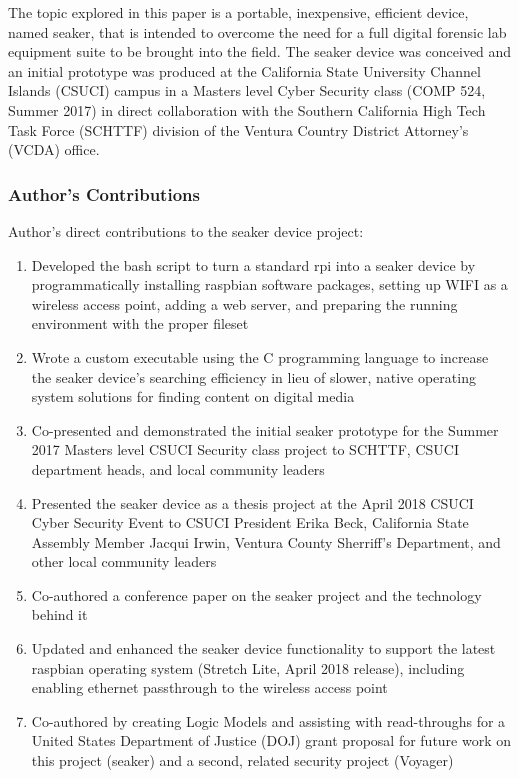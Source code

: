 \documentclass[12pt]{article}
\begin{document}
The topic explored in this paper is a portable, inexpensive, efficient device, named \gls{seaker},
that is intended to overcome the need for a full digital
forensic lab equipment suite to be brought into the field.  The \gls{seaker} device was conceived and 
an initial prototype was produced at the California State University Channel Islands (CSUCI)
campus in a 
Masters level Cyber Security class (COMP 524, Summer 2017) in direct collaboration with the
Southern California High Tech Task Force (SCHTTF) division of the Ventura Country
District Attorney's (VCDA) office.\\


\subsubsection{Author's Contributions}
Author's direct contributions to the \gls{seaker} device project:
\begin{enumerate}
  \item Developed the bash script to turn a standard \gls{rpi} into a
  \gls{seaker} device by programmatically
  installing raspbian software packages, setting up WIFI as a wireless access point, adding a web server,
  and preparing the running environment with the proper fileset
  \item Wrote a custom executable using the C programming language to increase the \gls{seaker} device's 
  searching efficiency in lieu of slower, native operating
  system solutions for finding content on digital media
  \item Co-presented and demonstrated the initial \gls{seaker} prototype for the Summer 2017 Masters level CSUCI
  Security class project to SCHTTF, CSUCI department heads, and local community leaders
  \item Presented the \gls{seaker} device as a thesis project at the April 2018 CSUCI Cyber Security Event
  to CSUCI President
  Erika Beck, California State Assembly Member Jacqui Irwin, Ventura County Sherriff's Department,
  and other local community leaders
  \item Co-authored a conference paper on the \gls{seaker} project and the technology behind it
  \item Updated and enhanced the \gls{seaker} device functionality to support the latest raspbian operating system (Stretch
  Lite, April 2018 release), including enabling ethernet passthrough to the wireless access point
  \item Co-authored by creating Logic Models and assisting with read-throughs for a United States
  Department of Justice (DOJ)
  grant proposal for future work on this project (\gls{seaker}) and
  a second, related security project (Voyager)
\end{enumerate}
\end{document}
